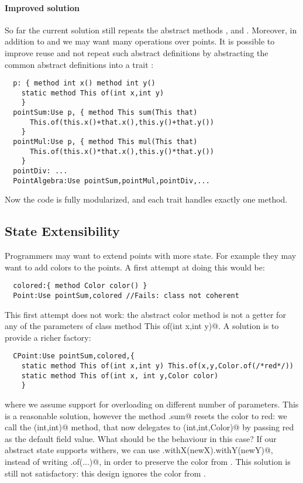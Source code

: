   \paragraph{Improved solution} So far the current solution still
  repeats the abstract methods \Q@x@, \Q@y@ and \Q@of@.
  Moreover, in addition to \Q@sum@ and \Q@mul@ we may want many
  operations over points. It is possible to improve reuse
  and not repeat such abstract definitions by abstracting the common
  abstract definitions into a trait \Q@p@: 
\saveSpace
\begin{lstlisting}
  p: { method int x() method int y()
    static method This of(int x,int y)
    }
  pointSum:Use p, { method This sum(This that)
      This.of(this.x()+that.x(),this.y()+that.y())
    }
  pointMul:Use p, { method This mul(This that)
      This.of(this.x()*that.x(),this.y()*that.y())
    }
  pointDiv: ...
  PointAlgebra:Use pointSum,pointMul,pointDiv,...
\end{lstlisting}
\saveSpace      
Now the code is fully modularized, and each trait handles exactly one method.

\subsection{State Extensibility}
Programmers may want to extend points with more state. For example 
they may want to add colors to the points. A first attempt at doing
this would be:
\saveSpace
\begin{lstlisting}
  colored:{ method Color color() }
  Point:Use pointSum,colored //Fails: class not coherent
\end{lstlisting}
\saveSpace
This first attempt does not work: the abstract color method
is not a getter for any of the parameters of 
\Q@ class method This of(int x,int y)@. 
A solution is to provide a richer factory:
\saveSpace
\begin{lstlisting}
  CPoint:Use pointSum,colored,{
    static method This of(int x,int y) This.of(x,y,Color.of(/*red*/))
    static method This of(int x, int y,Color color)
    }
\end{lstlisting}
\saveSpace
\noindent 
where we assume support for overloading on different number of parameters.
This is a reasonable solution, however the method \Q@CPoint.sum@ resets
the color to red: we call the \Q@of(int,int)@ method, that now
delegates to \Q@of(int,int,Color)@ by passing red as the default field
value.  What should be the behaviour in this case?  If our abstract
state supports withers, we can use
\Q@this.withX(newX).withY(newY)@, instead of writing \Q@This.of(...)@, in order to preserve the color from
\Q@this@.  This solution is still not satisfactory: this design ignores
the color from \Q@that@.

